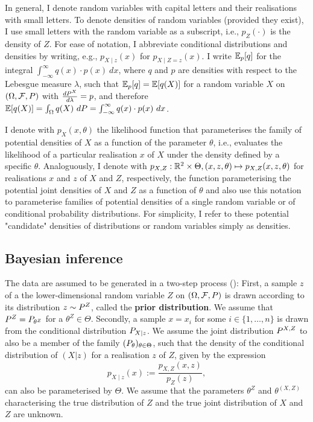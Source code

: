 In general, I denote random variables with capital letters and their realisations with small letters. To denote densities of random variables (provided they exist), I use small letters with the random variable as a subscript, i.e., $p_Z(\cdot)$ is the density of $Z$. For ease of notation, I abbreviate conditional distributions and densities by writing, e.g., $p_{X\mid z}(x)$ for $p_{X\mid Z=z}(x)$. I write $\E_p[q]$ for the integral $\int_{-\infty}^{\infty}q(x)\cdot p(x)~dx$, where $q$ and $p$ are densities with respect to the Lebesgue measure $\lambda$, such that $\E_p[q] = \E[q(X)]$ for a random variable $X$ on $(\Omega, \mathcal{F}, \P)$ with $\frac{d\P^X}{d\lambda} = p$, and therefore $\E[q(X)] = \int_{\Omega} q(X)~d\P = \int_{-\infty}^{\infty} q(x)\cdot p(x)~dx$.

I denote with $p_X(x,\theta)$ the likelihood function that parameterises the family of potential densities of $X$ as a function of the parameter $\theta$, i.e., evaluates the likelihood of a particular realisation $x$ of $X$ under the density defined by a specific $\theta$. Analoguously, I denote with $p_{X,Z}: \R^2 \times \Theta, (x,z,\theta) \mapsto p_{X,Z}(x,z,\theta)$ for realisations $x$ and $z$ of $X$ and $Z$, respectively, the function parameterising the potential joint densities of $X$ and $Z$ as a function of $\theta$ and also use this notation to parameterise families of potential densities of a single random variable or of conditional probability distributions. For simplicity, I refer to these potential "candidate" densities of distributions or random variables simply as densities.

\subsection{Bayesian inference}\label{sec:bayesian_inference}

The data are assumed to be generated in a two-step process (\cite[p.~2]{Kingma2013}): First, a sample $z$ of a the lower-dimensional random variable $Z$ on $(\Omega, \mathcal{F},\P)$ is drawn according to its distribution $z \sim \P^Z$, called the \textbf{prior distribution}. We assume that $\P^Z = \P_{\theta^{Z}}$ for a $\theta^{Z} \in \Theta$. Secondly, a sample $x = x_{i}$ for some $i\in \lbrace 1,\dots, n\rbrace$ is drawn from the conditional distribution $\P_{X\mid z}$. We assume the joint distribution $\P^{X,Z}$ to also be a member of the family $(\P_{\theta})_{\theta\in\Theta}$, such that the density of the conditional distribution of $(X\vert z)$ for a realisation $z$ of $Z$, given by the expression
$$
p_{X\mid z}(x) :=  \frac{p_{X,Z}(x,z)}{p_{Z}(z)},
$$
can also be parameterised by $\Theta$. We assume that the parameters $\theta^Z$ and $\theta^{(X,Z)}$ characterising the true distribution of $Z$ and the true joint distribution of $X$ and $Z$ are unknown. 


